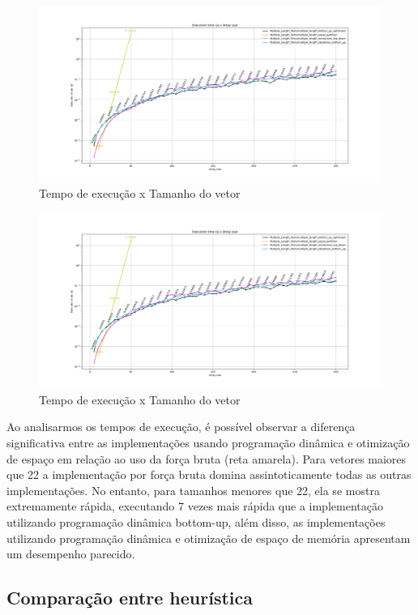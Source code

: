 \documentclass{article}
\begin{document}
\begin{figure} [H]
    \centering
    \caption{Tempo de execução x Tamanho do vetor}
    \includegraphics[width=1\textwidth]{images/means_comparasion.png}
\end{figure}

\begin{figure} [H]
    \centering
    \caption{Tempo de execução x Tamanho do vetor}
    \includegraphics[width=1\textwidth]{images/means_comparasion.png}
\end{figure}

Ao analisarmos os tempos de execução, é possível observar a diferença significativa entre as implementações usando programação dinâmica e otimização de espaço em relação ao uso da força bruta (reta amarela). Para vetores maiores que 22 a implementação por força bruta domina assintoticamente todas as outras implementações. No entanto, para tamanhos menores que 22, ela se mostra extremamente rápida, executando 7 vezes mais rápida que a implementação utilizando programação dinâmica bottom-up, além disso, as implementações utilizando programação dinâmica e otimização de espaço de memória apresentam um desempenho parecido.

\subsection{Comparação entre heurística}
\end{document}
